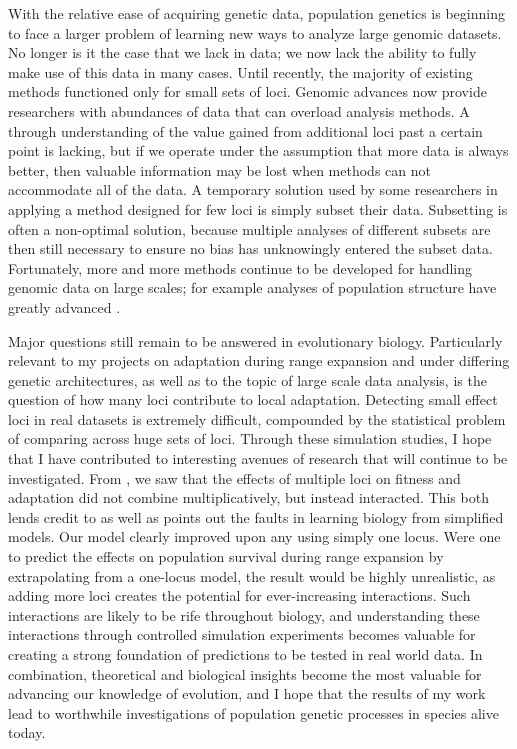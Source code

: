 With the relative ease of acquiring genetic data, population genetics is beginning to face a larger problem of learning new ways to analyze large genomic datasets. No longer is it the case that we lack in data; we now lack the ability to fully make use of this data in many cases. Until recently, the majority of existing methods functioned only for small sets of loci. Genomic advances now provide researchers with abundances of data that can overload analysis methods. A through understanding of the value gained from additional loci past a certain point is lacking, but if we operate under the assumption that more data is always better, then valuable information may be lost when methods can not accommodate all of the data. A temporary solution used by some researchers in applying a method designed for few loci is simply subset their data. Subsetting is often a non-optimal solution, because multiple analyses of different subsets are then still necessary to ensure no bias has unknowingly entered the subset data. Fortunately, more and more methods continue to be developed for handling genomic data on large scales; for example analyses of population structure have greatly advanced \citep{Raj:2014,Bradburd:2016, Petkova:2015}.

Major questions still remain to be answered in evolutionary biology. Particularly relevant to my projects on adaptation during range expansion and under differing genetic architectures, as well as to the topic of large scale data analysis, is the question of how many loci contribute to local adaptation. Detecting small effect loci in real datasets is extremely difficult, compounded by the statistical problem of comparing across huge sets of loci. Through these simulation studies, I hope that I have contributed to interesting avenues of research that will continue to be investigated. From , we saw that the effects of multiple loci on fitness and adaptation did not combine multiplicatively, but instead interacted. This both lends credit to as well as points out the faults in learning biology from simplified models. Our model clearly improved upon any using simply one locus. Were one to predict the effects on population survival during range expansion by extrapolating from a one-locus model, the result would be highly unrealistic, as adding more loci creates the potential for ever-increasing interactions. Such interactions are likely to be rife throughout biology, and understanding these interactions through controlled simulation experiments becomes valuable for creating a strong foundation of predictions to be tested in real world data. In combination, theoretical and biological insights become the most valuable for advancing our knowledge of evolution, and I hope that the results of my work lead to worthwhile investigations of population genetic processes in species alive today.

